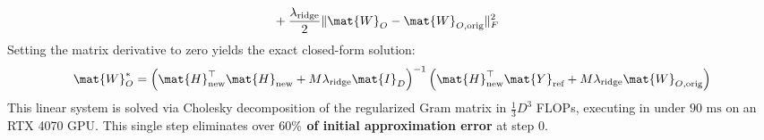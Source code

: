 \begin{enumerate}
\begin{equation}
\begin{split}
        & + \frac{\lambda_{\text{ridge}}}{2} \|\mat{W}_O - \mat{W}_{O, \text{orig}}\|_F^2
    \end{split}
    \label{eq:ridge_objective_sec4}
    \end{equation}
    Setting the matrix derivative to zero yields the exact closed-form solution:
    \begin{equation}
        \mat{W}_O^* = \left( \mat{H}_{\text{new}}^\top \mat{H}_{\text{new}} + M \lambda_{\text{ridge}} \mat{I}_D \right)^{-1} \left( \mat{H}_{\text{new}}^\top \mat{Y}_{\text{ref}} + M \lambda_{\text{ridge}} \mat{W}_{O, \text{orig}} \right)
        \label{eq:closed_form_ridge_sol}
    \end{equation}
    This linear system is solved via Cholesky decomposition of the regularized Gram matrix in $\frac{1}{3} D^3$ FLOPs, executing in under $90\text{ ms}$ on an RTX 4070 GPU. This single step eliminates over \textbf{$60\%$ of initial approximation error} at step 0.
\end{enumerate}

